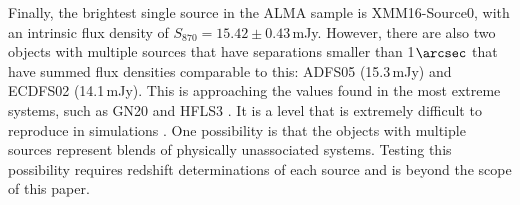 \documentclass[iop]{emulateapj}
\begin{document}

Finally, the brightest single source in the ALMA sample is XMM16-Source0, with
an intrinsic flux density of $S_{870} = 15.42 \pm 0.43\,$mJy.  However, there
are also two objects with multiple sources that have separations smaller than
1$\arcsec$ that have summed flux densities comparable to this: ADFS05
(15.3$\,$mJy) and ECDFS02 (14.1$\,$mJy).  This is approaching the values found
in the most extreme systems, such as GN20
\citep[20.6$\,$mJy,][]{2006MNRAS.370.1185P} and HFLS3
\citep[15-20$\,$mJy;][]{Riechers:2013lr, Cooray:2014rm}.  It is a level that is
extremely difficult to reproduce in simulations
\citep[e.g.,][]{Narayanan:2010lr}.  One possibility is that the objects with
multiple sources represent blends of physically unassociated systems.  Testing
this possibility requires redshift determinations of each source and is beyond
the scope of this paper.
\end{document}
